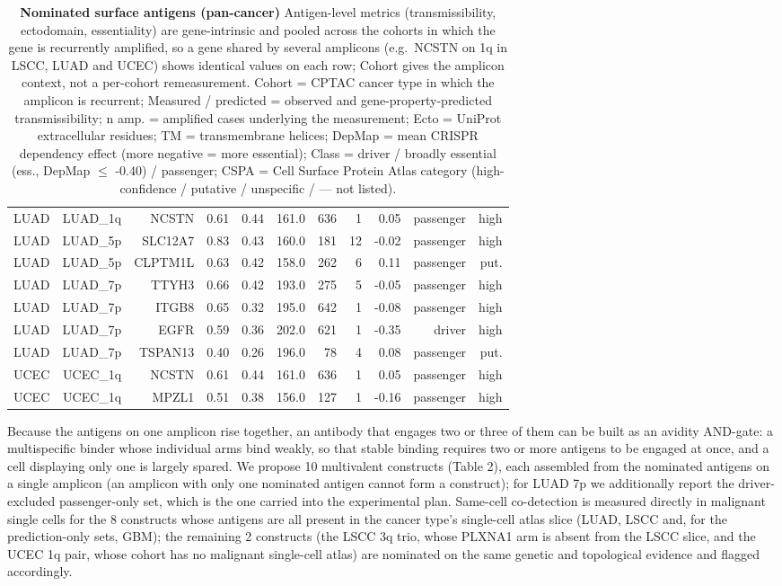 \documentclass[times, twoside]{zHenriquesLab-StyleBioRxiv}
\begin{document}
\begin{table}[tbp]
{\begin{tabular}{@{}lrrrrrrrrrr@{}}
LUAD & LUAD\_1q & NCSTN & 0.61 & 0.44 & 161.0 & 636 & 1 & 0.05 & passenger & high \\
LUAD & LUAD\_5p & SLC12A7 & 0.83 & 0.43 & 160.0 & 181 & 12 & -0.02 & passenger & high \\
LUAD & LUAD\_5p & CLPTM1L & 0.63 & 0.42 & 158.0 & 262 & 6 & 0.11 & passenger & put. \\
LUAD & LUAD\_7p & TTYH3 & 0.66 & 0.42 & 193.0 & 275 & 5 & -0.05 & passenger & high \\
LUAD & LUAD\_7p & ITGB8 & 0.65 & 0.32 & 195.0 & 642 & 1 & -0.08 & passenger & high \\
LUAD & LUAD\_7p & EGFR & 0.59 & 0.36 & 202.0 & 621 & 1 & -0.35 & driver & high \\
LUAD & LUAD\_7p & TSPAN13 & 0.40 & 0.26 & 196.0 & 78 & 4 & 0.08 & passenger & put. \\
UCEC & UCEC\_1q & NCSTN & 0.61 & 0.44 & 161.0 & 636 & 1 & 0.05 & passenger & high \\
UCEC & UCEC\_1q & MPZL1 & 0.51 & 0.38 & 156.0 & 127 & 1 & -0.16 & passenger & high \\
\bottomrule
\end{tabular}
}
\caption{\textbf{Nominated surface antigens (pan-cancer)} Antigen-level metrics (transmissibility, ectodomain, essentiality) are gene-intrinsic and pooled across the cohorts in which the gene is recurrently amplified, so a gene shared by several amplicons (e.g.\ NCSTN on 1q in LSCC, LUAD and UCEC) shows identical values on each row; Cohort gives the amplicon context, not a per-cohort remeasurement. Cohort = CPTAC cancer type in which the amplicon is recurrent; Measured / predicted = observed and gene-property-predicted transmissibility; n amp. = amplified cases underlying the measurement; Ecto = UniProt extracellular residues; TM = transmembrane helices; DepMap = mean CRISPR dependency effect (more negative = more essential); Class = driver / broadly essential (ess., DepMap $\leq$ -0.40) / passenger; CSPA = Cell Surface Protein Atlas category (high-confidence / putative / unspecific / --- not listed).}
\label{tab:antigens}
\end{table}
Because the antigens on one amplicon rise together, an antibody that engages two or three of them can be built as an avidity AND-gate: a multispecific binder whose individual arms bind weakly, so that stable binding requires two or more antigens to be engaged at once, and a cell displaying only one is largely spared. We propose 10 multivalent constructs (Table 2), each assembled from the nominated antigens on a single amplicon (an amplicon with only one nominated antigen cannot form a construct); for LUAD 7p we additionally report the driver-excluded passenger-only set, which is the one carried into the experimental plan. Same-cell co-detection is measured directly in malignant single cells for the 8 constructs whose antigens are all present in the cancer type's single-cell atlas slice (LUAD, LSCC and, for the prediction-only sets, GBM); the remaining 2 constructs (the LSCC 3q trio, whose PLXNA1 arm is absent from the LSCC slice, and the UCEC 1q pair, whose cohort has no malignant single-cell atlas) are nominated on the same genetic and topological evidence and flagged accordingly.
\end{document}
